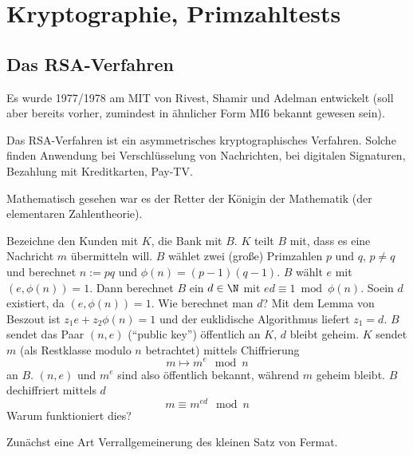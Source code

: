 \chapter{Kryptographie, Primzahltests}



\section{Das RSA-Verfahren}

Es wurde 1977/1978 am MIT von Rivest, Shamir und Adelman entwickelt (soll aber bereits vorher, zumindest in ähnlicher Form MI6 bekannt gewesen sein).

Das RSA-Verfahren ist ein asymmetrisches kryptographisches Verfahren.
Solche finden Anwendung bei Verschlüsselung von Nachrichten, bei digitalen Signaturen, Bezahlung mit Kreditkarten, Pay-TV.

Mathematisch gesehen war es der Retter der Königin der Mathematik (der elementaren Zahlentheorie).

Bezeichne den Kunden mit $K$, die Bank mit $B$.
$K$ teilt $B$ mit, dass es eine Nachricht $m$ übermitteln will.
$B$ wählet zwei (große) Primzahlen $p$ und $q$, $p \neq q$ und berechnet $n := pq$ und $\phi(n) = (p-1)(q-1)$.
$B$ wählt $e$ mit $(e, \phi(n)) = 1$.
Dann berechnet $B$ ein $d \in \N$ mit $ed \equiv 1 \bmod \phi(n)$.
Soein $d$ existiert, da $(e, \phi(n)) = 1$.
Wie berechnet man $d$?
Mit dem Lemma von Beszout ist $z_1 e + z_2 \phi(n) = 1$ und der euklidische Algorithmus liefert $z_1 = d$.
$B$ sendet das Paar $(n, e)$ (“public key”) öffentlich an $K$, $d$ bleibt geheim.
$K$ sendet $m$ (als Restklasse modulo $n$ betrachtet) mittels Chiffrierung
\[
	m \mapsto m^e \mod n
\]
an $B$.
$(n, e)$ und $m^e$ sind also öffentlich bekannt, während $m$ geheim bleibt.
$B$ dechiffriert mittels $d$
\[
	m \equiv m^{ed} \mod n
\]
Warum funktioniert dies?


Zunächst eine Art Verrallgemeinerung des kleinen Satz von Fermat.

